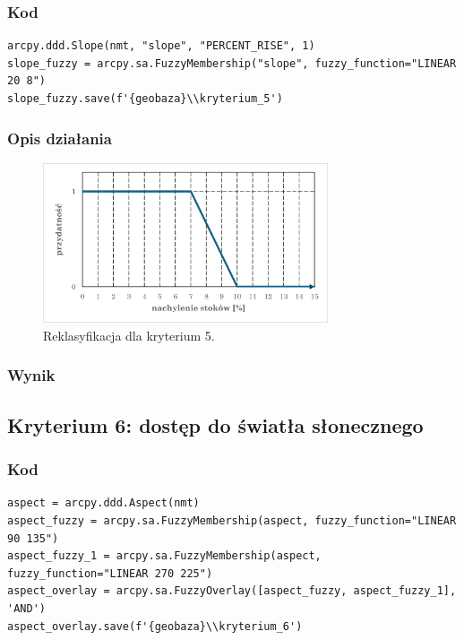 \documentclass{article}
\begin{document}
\subsubsection{Kod}
\begin{lstlisting}
arcpy.ddd.Slope(nmt, "slope", "PERCENT_RISE", 1)
slope_fuzzy = arcpy.sa.FuzzyMembership("slope", fuzzy_function="LINEAR 20 8")
slope_fuzzy.save(f'{geobaza}\\kryterium_5')
\end{lstlisting}

\subsubsection{Opis działania}
\begin{figure}[H]
    \centering
    \includegraphics[width=0.75\textwidth]{img/kryterium5-wykres-glowny.png}
    \caption*{Reklasyfikacja dla kryterium 5.}
\end{figure}
\subsubsection{Wynik}
\newpage
\subsection{Kryterium 6: dostęp do światła słonecznego}
\subsubsection{Kod}
\begin{lstlisting}
aspect = arcpy.ddd.Aspect(nmt)
aspect_fuzzy = arcpy.sa.FuzzyMembership(aspect, fuzzy_function="LINEAR 90 135")
aspect_fuzzy_1 = arcpy.sa.FuzzyMembership(aspect, fuzzy_function="LINEAR 270 225")
aspect_overlay = arcpy.sa.FuzzyOverlay([aspect_fuzzy, aspect_fuzzy_1], 'AND')
aspect_overlay.save(f'{geobaza}\\kryterium_6')
\end{lstlisting}
\end{document}
